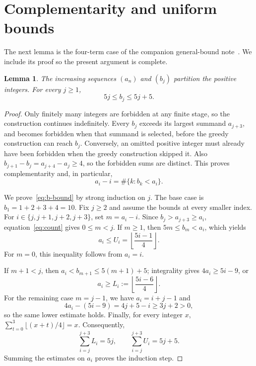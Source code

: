 \documentclass[11pt]{article}
\newtheorem{lemma}[theorem]{Lemma}
\begin{document}
\section{Complementarity and uniform bounds}

The next lemma is the four-term case of the companion general-bound
note~\cite{bounds}. We include its proof so the present argument is complete.

\begin{lemma}\label{lem:bounds}
The increasing sequences $(a_n)$ and $(b_j)$ partition the positive integers.
For every $j\ge1$,
\begin{equation}\label{eq:b-bound}
 5j\le b_j\le5j+5.
\end{equation}
\end{lemma}

\begin{proof}
Only finitely many integers are forbidden at any finite stage, so the
construction continues indefinitely. Every $b_j$ exceeds its largest summand
$a_{j+3}$, and becomes forbidden when that summand is selected, before the
greedy construction can reach $b_j$. Conversely, an omitted positive integer
must already have been forbidden when the greedy construction skipped it.
Also $b_{j+1}-b_j=a_{j+4}-a_j\ge4$, so the forbidden sums are distinct. This
proves complementarity and, in particular,
\begin{equation}\label{eq:count}
 a_i-i=\#\{k:b_k<a_i\}.
\end{equation}

We prove~\eqref{eq:b-bound} by strong induction on $j$. The base case is
$b_1=1+2+3+4=10$. Fix $j\ge2$ and assume the bounds at every smaller index.
For $i\in\{j,j+1,j+2,j+3\}$, set $m=a_i-i$. Since $b_j>a_{j+3}\ge a_i$,
equation~\eqref{eq:count} gives $0\le m<j$.
If $m\ge1$, then $5m\le b_m<a_i$, which yields
\[
 a_i\le U_i=\left\lfloor\frac{5i-1}{4}\right\rfloor.
\]
For $m=0$, this inequality follows from $a_i=i$.

If $m+1<j$, then $a_i<b_{m+1}\le5(m+1)+5$; integrality gives
$4a_i\ge5i-9$, or
\[
 a_i\ge L_i:=\left\lfloor\frac{5i-6}{4}\right\rfloor.
\]
For the remaining case $m=j-1$, we have $a_i=i+j-1$ and
\[
 4a_i-(5i-9)=4j+5-i\ge3j+2>0,
\]
so the same lower estimate holds. Finally, for every integer $x$,
$\sum_{t=0}^3\lfloor(x+t)/4\rfloor=x$. Consequently,
\[
 \sum_{i=j}^{j+3}L_i=5j,
 \qquad \sum_{i=j}^{j+3}U_i=5j+5.
\]
Summing the estimates on $a_i$ proves the induction step.
\end{proof}
\end{document}
